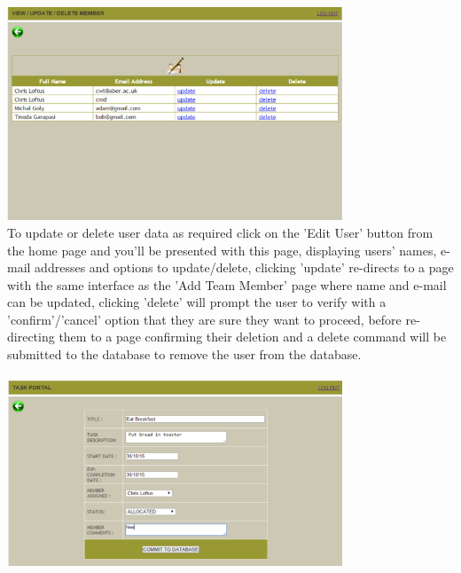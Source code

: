 \documentclass{project}
\begin{document}
\newline
\includegraphics[width=0.75\textwidth, center]{images/5.2/TaskerMANEditUser} \\
To update or delete user data as required \cite{se.qa.rs fr3} click on the 'Edit User' button from the home page and you'll be presented with this page, displaying users' names, e-mail addresses and options to update/delete, clicking 'update' re-directs to a page with the same interface as the 'Add Team Member' page where name and e-mail can be updated, clicking 'delete' will prompt the user to verify with a 'confirm'/'cancel' option that they are sure they want to proceed, before re-directing them to a page confirming their deletion and a delete command will be submitted to the database to remove the user from the database. \\~\\
\newline
\includegraphics[width=0.75\textwidth, center]{images/5.2/TaskerMANAddTask} \\
\end{document}
